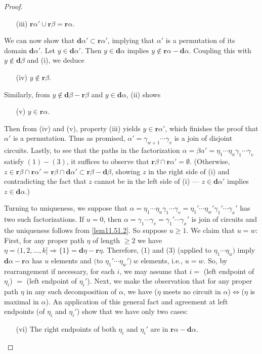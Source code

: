 \documentclass{surv-l}
\numberwithin{equation}{section}
\numberwithin{table}{section}
\numberwithin{figure}{section}
\theoremstyle{definition}
\begin{document}
\begin{proof}
\begin{enumerate}
\item[(iii)] $\mathbf{r}\alpha'\cup \mathbf{r}\beta=\mathbf{r}\alpha$.
\end{enumerate}
We can now show that $\mathbf{d}\alpha'\subset \mathbf{r}\alpha'$,
implying that $\alpha'$ is a permutation of its domain
$\mathbf{d}\alpha'$. Let $y\in \mathbf{d}\alpha'$. Then $ y\in
\mathbf{d}\alpha$ implies $y\not\in
\mathbf{r}\alpha-\mathbf{d}\alpha$. Coupling this with $ y\not\in
\mathbf{d}\beta$ and (i), we deduce
\begin{enumerate}
\item[(iv)] $y\not\in \mathbf{r}\beta$.
\end{enumerate}
Similarly, from $ y\not\in \mathbf{d}\beta-\mathbf{r}\beta$ and
$y\in \mathbf{d}\alpha$, (ii) shows
\begin{enumerate}
\item[(v)] $y\in \mathbf{r}\alpha$.
\end{enumerate}
Then from (iv) and (v), property (iii) yields $y\in
\mathbf{r}\alpha'$, which finishes the proof that $\alpha'$ is a
permutation. Thus as promised,
$\alpha'=\gamma_{w+1}\cdots\gamma_{v}$ is a join of disjoint
circuits. Lastly, to see that the paths in the factorization
$\alpha=\beta\alpha'=\eta_{1}\cdots\eta_{u}\gamma_{1}\cdots\gamma_{v}$
satisfy $(1)-(3)$, it suffices to observe that
$\mathbf{r}\beta\cap \mathbf{r}\alpha'=\emptyset$. (Otherwise, $z
\in \mathbf{r}\beta\cap \mathbf{r}\alpha'=\mathbf{r}\beta\cap
\mathbf{d}\alpha'\subset \mathbf{r}\beta-\mathbf{d}\beta$, showing
$z$ in the right side of (i) and contradicting the fact that $z$
cannot be in the left side of (i) --- $z \in \mathbf{d}\alpha'$
implies $z\in \mathbf{d}\alpha.$)

Turning to uniqueness, we suppose that
$\alpha=\eta_{1}\cdots\eta_{u}\gamma_{1}\cdots\gamma_{v}=\eta_{1}'\cdots
\eta_{w}'\gamma_{1}'\cdots \gamma_{x}'$ has two such
factorizations. If $u=0$, then $\alpha=\gamma_{1}\cdots\gamma_{v}=
\gamma_{1}'\cdots\gamma_{x}'$ is join of circuits and the
uniqueness follows from \ref{lem11.51.2}. So suppose $u\geq 1$. We
claim that $u=w$: First, for any proper path $\eta$ of length
$\geq 2$ we have $\eta=(1,2,\ldots, k]\Rightarrow\{1\}
=\mathbf{d}\eta-\mathbf{r}\eta$. Therefore, (1) and (3) (applied
to $\eta_{1}\cdots\eta_{u})$ imply
$\mathbf{d}\alpha-\mathbf{r}\alpha$ has $u$ elements and $($to
$\eta_{1}'\cdots\eta_{w}')\ w$ elements, i.e., $u=w$. So, by
rearrangement if necessary, for each $i$, we may assume that $i=$
(left endpoint of $\eta_{i}$) $=$ (left endpoint of $\eta_{i}'$).
Next, we make the observation that for any proper path $\eta$ in
any such decomposition of $\alpha$, we have ($\eta$ meets no
circuit in $\alpha$)\quad $\Leftrightarrow$\quad ($\eta$ is maximal in
$\alpha$). An application of this general fact and agreement at
left endpoints (of $\eta_{i}$ and $\eta_{i}'$) show that we have
only two cases:
\begin{enumerate}
\item[(vi)] The right endpoints of both $\eta_{i}$ and $\eta_{i}'$ are in
$\mathbf{r}\alpha-\mathbf{d}\alpha$.


\end{enumerate}
\end{proof}
\end{document}
